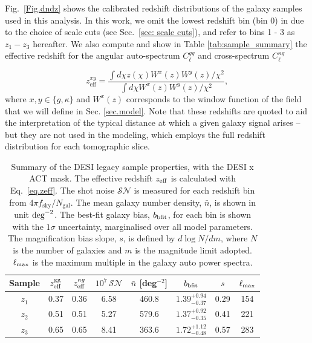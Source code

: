 \documentclass[twocolumn]{aastex631}
\begin{document}
{%
Fig.~\ref{Fig.dndz} shows the calibrated redshift distributions of the galaxy samples used in this analysis. 
In this work, we omit the lowest redshift bin (bin 0) in \cite{hang2021} due to the choice of scale cuts (see Sec.~\ref{sec: scale cuts}), and refer to bins 1 - 3 as $z_1 - z_3$ hereafter.
We also compute and show in Table \ref{tab:sample_summary} the effective redshift for the angular auto-spectrum $C^{gg}_\ell$ and cross-spectrum $C^{\kappa{g}}_\ell$ 

\begin{equation} \label{eq.zeff}
    z^{xy}_\mathrm{eff}=\frac{\int{d\chi}z(\chi)W^x(z)W^y(z)/\chi^2}{\int{d\chi}W^x(z)W^y(z)/\chi^2},
\end{equation}
where $x,y\in\{g,\kappa\}$ and  $W^x(z)$ corresponds to the window function of the field that we will define in Sec. \ref{sec.model}. Note that these redshifts are quoted to aid the interpretation of the typical distance at which a given galaxy signal arises -- but they are not used in the modeling, which employs the full redshift distribution for each tomographic slice.


\begin{table}
    \caption{
   Summary of the DESI legacy sample properties, {with the DESI x ACT mask}. The effective redshift $z_{\rm eff}$ is calculated with Eq.~\eqref{eq.zeff}. The shot noise $\mathcal{SN}$ is measured for each redshift bin from $4\pi{f}_\mathrm{sky}/N_\mathrm{gal}.$ 
   {The mean galaxy number density, $\bar{n}$, is shown in unit ${\rm deg}^{-2}$. The best-fit galaxy bias, $b_{\rm bfit}$, for each bin is shown with the $1\sigma$ uncertainty, marginalised over all model parameters. The magnification bias slope, $s$, is defined by $d\log N/dm$, where $N$ is the number of galaxies and $m$ is the magnitude limit adopted. $\ell_{\rm max}$ is the maximum multiple in the galaxy auto power spectra.}
   }
    \centering
    \begin{tabular}{c ccccccc }
     \hline
 \hline
         Sample & $z^{\mathrm{gg}}_{\rm eff}$ & $z^{\kappa{g}}_{\rm eff}$ & $10^7\,\mathcal{SN}$ & $\bar{n}$ [deg$^{-2}$] & $b_{\rm bfit}$ & $s$ & $\ell_{\rm max}$\\
         \hline
         $z_1$ & 0.37 &0.36& 6.58 & 460.8 & $1.39^{+0.94}_{-0.37}$ &0.29 &154\\
         $z_2$ & 0.51 &0.51& 5.27 & 579.6 & $1.37^{+0.92}_{-0.35}$ &0.41 &221\\
         $z_3$ & 0.65 & 0.65&8.41 & 363.6 & $1.72^{+1.12}_{-0.48}$ &0.57 &283\\
   \hline


\end{tabular}
\end{table}}
\end{document}
